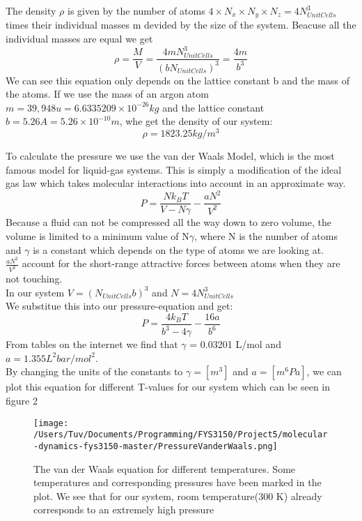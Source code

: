 \documentclass[a4paper, 12pt]{article}
\begin{document}
The density $\rho$ is given by the number of atoms $4\times N_x \times N_y \times N_z = 4N_{UnitCells}^3$ times their individual masses m devided by the size of the system. Beacuse all the individual masses are equal we get
\begin{equation}
\rho = \frac{M}{V} = \frac{4mN_{UnitCells}^{3}}{(bN_{UnitCells})^{3}} = \frac{4m}{b^{3}}
\end{equation}
We can see this equation only depends on the lattice constant b and the mass of the atoms. If we use the mass of an argon atom $m = 39,948 u = 6.6335209 \times 10^{-26} kg$ and the lattice constant $b = 5.26 A = 5.26 \times 10^{-10} m$, whe get the density of our system: $$\rho = 1823.25 \mathit{kg/m^3}$$

To calculate the pressure we use the van der Waals Model, which is the most famous model for liquid-gas systems. This is simply a modification of the ideal gas law which takes molecular interactions into account in an approximate way.
\begin{equation}
P = \frac{N k_B T}{V - N\gamma} - \frac{aN^{2}}{V^{2}}
\end{equation}
Because a fluid can not be compressed all the way down to zero volume, the volume is limited to a minimum value of N$\gamma$, where N is the number of atoms and $\gamma$ is a constant which depends on the type of atoms we are looking at.\\
$ \frac{aN^{2}}{V^{2}}$ account for the short-range attractive forces between atoms when they are not touching.\\

In our system $V = (N_{UnitCells}b)^3$ and $N = 4N_{UnitCells}^3$\\
We substitue this into our pressure-equation and get:
\begin{equation}
P = \frac{4k_B T}{b^{3} - 4\gamma} - \frac{16a}{b^{6}}
\end{equation}
From tables on the internet\cite{Argon} we find that $\gamma$ = 0.03201 L/mol and $a = 1.355 L^2 bar/mol^2$.\\
By changing the units of the constants to $\gamma = [m^3]$ and $a = [m^6 Pa] $, we can plot this equation for different T-values for our system which can be seen in figure 2\\

\begin{figure}[H]
\centering
\texttt{[image: /Users/Tuv/Documents/Programming/FYS3150/Project5/molecular-dynamics-fys3150-master/PressureVanderWaals.png]}
\caption{The van der Waals equation for different temperatures. Some temperatures and corresponding pressures have been marked in the plot. We see that for our system, room temperature(300 K) already corresponds to an extremely high pressure}
\end{figure}
 
\end{document}
